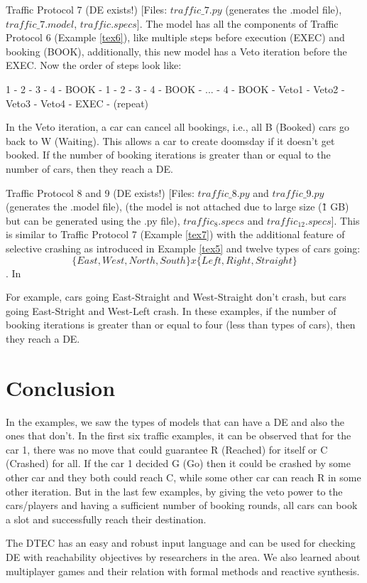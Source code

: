 \documentclass[format=acmsmall, review=false]{acmart}
\begin{document}
\begin{example}\label{tex7}
Traffic Protocol 7 (DE exists!) [Files: $traffic\_7.py$ (generates the .model file), $traffic\_7.model$, $traffic.specs$]. The model has all the components of Traffic Protocol 6 (Example \ref{tex6}), like multiple steps before execution (EXEC) and booking (BOOK), additionally, this new model has a Veto iteration before the EXEC. Now the order of steps look like:

1 - 2 - 3 - 4 - BOOK - 1 - 2 - 3 - 4 - BOOK - ... - 4 - BOOK - Veto1 - Veto2 - Veto3 - Veto4 - EXEC - (repeat)

In the Veto iteration, a car can cancel all bookings, i.e., all B (Booked) cars go back to W (Waiting). This allows a car to create doomsday if it doesn't get booked. If the number of booking iterations is greater than or equal to the number of cars, then they reach a DE.
\end{example}

\begin{example}\label{tex8}
Traffic Protocol 8 and 9 (DE exists!) [Files: $traffic\_8.py$ and $traffic\_9.py$ (generates the .model file), (the model is not attached due to large size (\~1 GB) but can be generated using the .py file), $traffic_8.specs$ and $traffic_12.specs$]. This is similar to Traffic Protocol 7 (Example \ref{tex7}) with the additional feature of selective crashing as introduced in Example \ref{tex5} and twelve types of cars going:
\[\{East,West,North,South\} x \{Left,Right,Straight\}\]. In 

For example, cars going East-Straight and West-Straight don't crash, but cars going East-Stright and West-Left crash. In these examples, if the number of booking iterations is greater than or equal to four (less than types of cars), then they reach a DE.
\end{example}

\section{Conclusion}

In the examples, we saw the types of models that can have a DE and also the ones that don't. In the first six traffic examples, it can be observed that for the car 1, there was no move that could guarantee R (Reached) for itself or C (Crashed) for all. If the car 1 decided G (Go) then it could be crashed by some other car and they both could reach C, while some other car can reach R in some other iteration. But in the last few examples, by giving the veto power to the cars/players and having a sufficient number of booking rounds, all cars can book a slot and successfully reach their destination.

The DTEC has an easy and robust input language and can be used for checking DE with reachability objectives by researchers in the area. We also learned about multiplayer games and their relation with formal methods and reactive synthesis.




\end{document}
